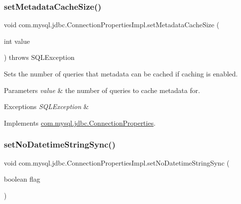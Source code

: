 \subsubsection{\texorpdfstring{set\+Metadata\+Cache\+Size()}{setMetadataCacheSize()}}
{\footnotesize\ttfamily void com.\+mysql.\+jdbc.\+Connection\+Properties\+Impl.\+set\+Metadata\+Cache\+Size (\begin{DoxyParamCaption}\item[{int}]{value }\end{DoxyParamCaption}) throws S\+Q\+L\+Exception}

Sets the number of queries that metadata can be cached if caching is enabled.


\begin{DoxyParams}{Parameters}
{\em value} & the number of queries to cache metadata for. \\
\hline
\end{DoxyParams}

\begin{DoxyExceptions}{Exceptions}
{\em S\+Q\+L\+Exception} & \\
\hline
\end{DoxyExceptions}


Implements \mbox{\hyperlink{interfacecom_1_1mysql_1_1jdbc_1_1_connection_properties_aa29a8dc1d36b7044717dce95a3ddbc4e}{com.\+mysql.\+jdbc.\+Connection\+Properties}}.

\mbox{\label{classcom_1_1mysql_1_1jdbc_1_1_connection_properties_impl_acd5096d201db849e11a80ddfb49c5c7e}} 
\subsubsection{\texorpdfstring{set\+No\+Datetime\+String\+Sync()}{setNoDatetimeStringSync()}}
{\footnotesize\ttfamily void com.\+mysql.\+jdbc.\+Connection\+Properties\+Impl.\+set\+No\+Datetime\+String\+Sync (\begin{DoxyParamCaption}\item[{boolean}]{flag }\end{DoxyParamCaption})}


